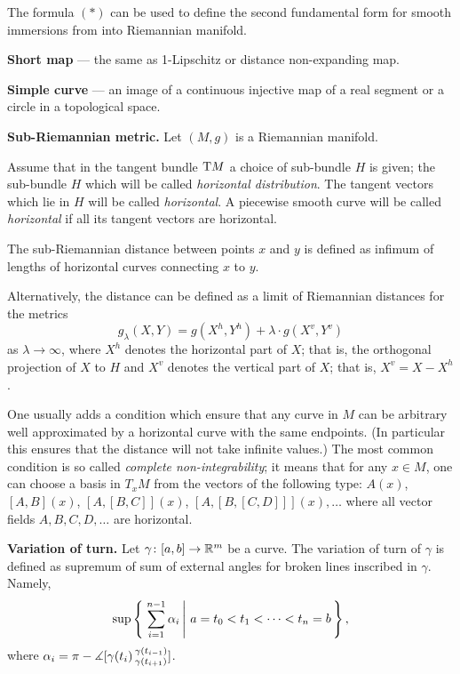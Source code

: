 \begin{description}
The formula $({*})$ can be used to define the second fundamental form for smooth immersions from into Riemannian manifold.

\item{\bf Short map}\label{Short map} --- the same as 1-Lipschitz 
or distance non-expanding map.

\item{\bf Simple curve}\label{Simple curve} --- an image of a continuous injective map of a real segment or a circle in a topological space.

\item{\bf Sub-Riemannian metric.}\label{Sub-Riemannian metric}
Let $(M,g)$ is a Riemannian manifold.

Assume that in the tangent bundle $\mathrm{T} M$ 
a choice of sub-bundle $H$ is given;
the sub-bundle $H$ which will be called  \emph{horizontal distribution}.
The tangent vectors which lie in $H$ will be called \emph{horizontal}.
A piecewise smooth curve will be called \emph{horizontal}
if all its tangent vectors are horizontal.

The sub-Riemannian distance between points $x$ and $y$ is defined as infimum of lengths of horizontal curves connecting $x$ to $y$.

Alternatively, the distance can be defined as a limit of Riemannian distances 
for the metrics 
\[g_\lambda(X,Y)=g(X^h,Y^h)+\lambda\cdot g(X^v,Y^v)\] 
as $\lambda\to \infty$,
where $X^h$ denotes the horizontal part of $X$;
that is, the orthogonal projection of $X$ to $H$
and $X^v$ denotes the vertical part of $X$;
that is, $X^v=X-X^h$.

One usually adds a condition which ensure that any curve in $M$ can be arbitrary well approximated by a horizontal curve with the same endpoints.
(In particular this ensures that the distance will not take infinite values.)
The most common condition is so called  \emph{complete non-integrability};
it means that for any $x\in M$, 
one can choose a basis in $T_xM$
from the vectors of the following type:
$A(x)$, $[A,B](x)$, $[A,[B,C]](x)$, $[A,[B,[C,D]]](x),\dots$ where all vector fields $A,B,C,D, \dots$ are horizontal.


\item{\bf Variation of turn.}
\label{Variation of turn} 
Let $\gamma\colon[a,b]\to\mathbb{R}^m$ be a curve.
The variation of turn of $\gamma$ is defined as supremum of sum of external angles for broken lines inscribed in $\gamma$. 
Namely, 
$$\sup\set{\sum_{i=1}^{n-1}\alpha_i}{a=t_0<t_1<\dots<t_n=b},$$
where $\alpha_i=\pi-\measuredangle [\gamma(t_{i})\,{}^{\gamma(t_{i-1})}_{\gamma(t_{i+1})}]$.


\end{description}
